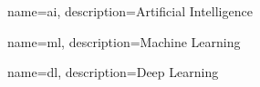 {
    name=ai,
    description={Artificial Intelligence}
}

{
    name=ml,
    description={Machine Learning}
}

{
    name=dl,
    description={Deep Learning}
}

